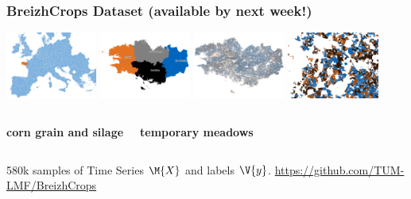 \documentclass[%
  aspectratio=169,
  9pt,
  USenglish,
  titlegraphic, %
  affiliationintitlepagehead,
  affiliation,
]{beamer}
\begin{document}
\begin{frame}
\frametitle{BreizhCrops Dataset (available by next week!)}

\includegraphics[width=3cm]{images/map/europe}
\includegraphics[width=3cm]{images/map/regions}
\includegraphics[width=3cm]{images/map/breizh}
\includegraphics[width=3cm]{images/map/parcels}

\vspace{1em}


\begin{columns}
	
	\textbf{corn grain and silage}
	
	
	\textbf{temporary meadows}
	
\end{columns}

\vspace{1em}

\Large
580k samples of Time Series $\M{X}$ and labels $\V{y}$. \Large \url{https://github.com/TUM-LMF/BreizhCrops}

\end{frame}
\end{document}
